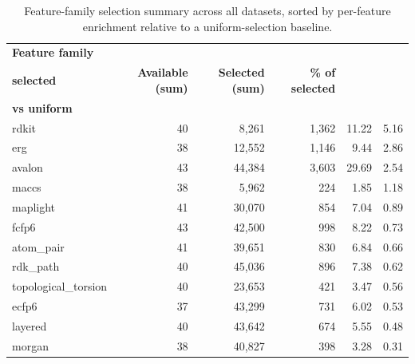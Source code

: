 \begin{table}[htbp]
\centering
\footnotesize
\caption{Feature-family selection summary across all datasets, sorted by per-feature enrichment relative to a uniform-selection baseline.}
\label{tab:s3}
\begin{tabularx}{\textwidth}{@{}>{\raggedright\arraybackslash}Xrrrrr@{}}
\toprule
\textbf{Feature family} & \makecell[r]{\textbf{Datasets}\\\textbf{selected}} & \textbf{Available (sum)} & \textbf{Selected (sum)} & \textbf{\% of selected} & \makecell[r]{\textbf{Enrichment}\\\textbf{vs uniform}} \\
\midrule
rdkit & 40 & 8,261 & 1,362 & 11.22 & 5.16 \\
erg & 38 & 12,552 & 1,146 & 9.44 & 2.86 \\
avalon & 43 & 44,384 & 3,603 & 29.69 & 2.54 \\
maccs & 38 & 5,962 & 224 & 1.85 & 1.18 \\
maplight & 41 & 30,070 & 854 & 7.04 & 0.89 \\
fcfp6 & 43 & 42,500 & 998 & 8.22 & 0.73 \\
atom\_\allowbreak{}pair & 41 & 39,651 & 830 & 6.84 & 0.66 \\
rdk\_\allowbreak{}path & 40 & 45,036 & 896 & 7.38 & 0.62 \\
topological\_\allowbreak{}torsion & 40 & 23,653 & 421 & 3.47 & 0.56 \\
ecfp6 & 37 & 43,299 & 731 & 6.02 & 0.53 \\
layered & 40 & 43,642 & 674 & 5.55 & 0.48 \\
morgan & 38 & 40,827 & 398 & 3.28 & 0.31 \\
\bottomrule
\end{tabularx}
\end{table}
